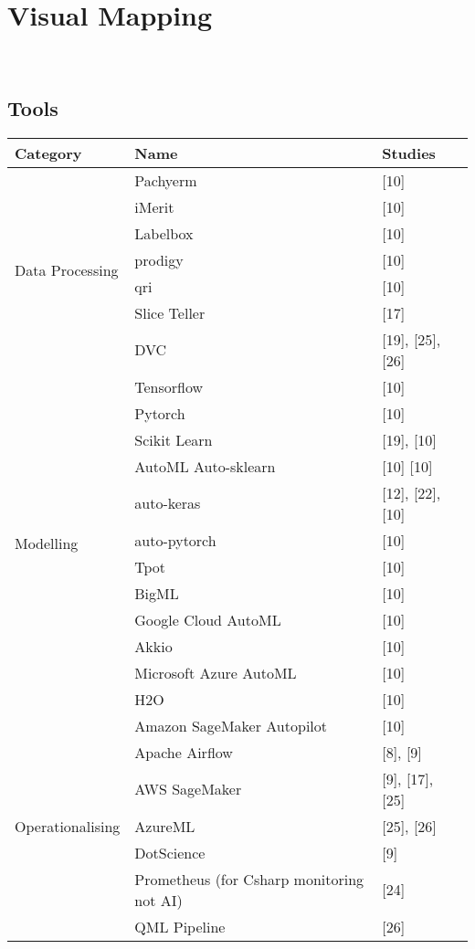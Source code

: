 \section{Visual Mapping}~\label{sec:visual-mapping}

\subsection{Tools}

\begin{tabular}{|p{3cm}|p{3cm}|p{2cm}|}
  \hline
  Category & Name & Studies \\
  \hline
  \multirow{7}{*}{Data Processing} & Pachyerm & [10] \\
  \cline{2-3}
  & iMerit & [10] \\
  \cline{2-3}
  & Labelbox & [10] \\
  \cline{2-3}
  & prodigy & [10] \\
  \cline{2-3}
  & qri & [10] \\
  \cline{2-3}
  & Slice Teller & [17] \\
  \cline{2-3}
  & DVC & [19], [25], [26] \\
  \hline
  \multirow{12}{*}{Modelling} & Tensorflow & [10] \\
  \cline{2-3}
  & Pytorch & [10] \\
  \cline{2-3}
  & Scikit Learn & [19], [10] \\
  \cline{2-3}
  & AutoML Auto-sklearn & [10] [10] \\
  \cline{2-3}
  & auto-keras & [12], [22], [10] \\
  \cline{2-3}
  & auto-pytorch & [10] \\
  \cline{2-3}
  & Tpot & [10] \\
  \cline{2-3}
  & BigML & [10] \\
  \cline{2-3}
  & Google Cloud AutoML & [10] \\
  \cline{2-3}
  & Akkio & [10] \\
  \cline{2-3}
  & Microsoft Azure AutoML & [10] \\
  \cline{2-3}
  & H2O & [10] \\
  \cline{2-3}
  & Amazon SageMaker Autopilot & [10] \\
  \hline
  \multirow{5}{*}{Operationalising} & Apache Airflow & [8], [9] \\
  \cline{2-3}
  & AWS SageMaker & [9], [17], [25] \\
  \cline{2-3}
  & AzureML & [25], [26] \\
  \cline{2-3}
  & DotScience & [9] \\
  \hline
  \multirow{2}{*}{Other} & Prometheus (for Csharp monitoring not AI) & [24] \\
  \cline{2-3}
  & QML Pipeline & [26] \\
  \hline
\end{tabular}

